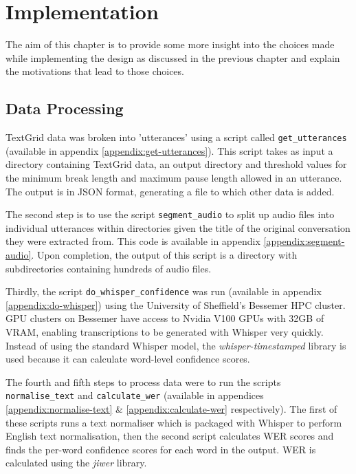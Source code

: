 \chapter{Implementation}\label{ch:implementation-and-testing}

The aim of this chapter is to provide some more insight into the choices made while implementing the design as discussed in the previous chapter and explain the motivations that lead to those choices.

\section{Data Processing}

TextGrid data was broken into 'utterances' using a script called \texttt{get\_utterances} (available in appendix \ref{appendix:get-utterances}).
This script takes as input a directory containing TextGrid data, an output directory and threshold values for the minimum break length and maximum pause length allowed in an utterance.
The output is in JSON format, generating a file to which other data is added.

The second step is to use the script \texttt{segment\_audio} to split up audio files into individual utterances within directories given the title of the original conversation they were extracted from.
This code is available in appendix \ref{appendix:segment-audio}.
Upon completion, the output of this script is a directory with subdirectories containing hundreds of audio files.

Thirdly, the script \texttt{do\_whisper\_confidence} was run (available in appendix \ref{appendix:do-whisper}) using the University of Sheffield's Bessemer HPC cluster\cite{shef-hpc}.
GPU clusters on Bessemer have access to Nvidia V100 GPUs with 32GB of VRAM, enabling transcriptions to be generated with Whisper very quickly.
Instead of using the standard Whisper model, the \emph{whisper-timestamped}\cite{whisper-timestamped} library is used because it can calculate word-level confidence scores.

The fourth and fifth steps to process data were to run the scripts \texttt{normalise\_text} and \texttt{calculate\_wer} (available in appendices \ref{appendix:normalise-text} \& \ref{appendix:calculate-wer} respectively).
The first of these scripts runs a text normaliser which is packaged with Whisper\cite{whisper} to perform English text normalisation, then the second script calculates WER scores and finds the per-word confidence scores for each word in the output.
WER is calculated using the \emph{jiwer}\cite{jiwer} library.

